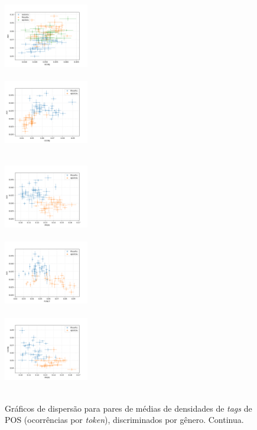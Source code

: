 \documentclass[10pt,a4paper,onecolumn]{article}
\theoremstyle{definition}
\theoremstyle{remark}
\begin{document}
\begin{figure}[htpb!]
\begin{multicols}{3}
		\includegraphics[width=0.33\textwidth]{graficos/ADV_x_SCONJ.png} \\  \\
		\includegraphics[width=0.33\textwidth]{graficos/AUX_x_CCONJ.png} \\  \\
	\end{multicols}\vspace{-0.8cm}
	\begin{multicols}{3}
		\includegraphics[width=0.33\textwidth]{graficos/AUX_x_PRON.png} \\  \\
		\includegraphics[width=0.33\textwidth]{graficos/AUX_x_PUNCT.png} \\  \\
		\includegraphics[width=0.33\textwidth]{graficos/CCONJ_x_PRON.png} \\  \\
	\end{multicols}\vspace{-0.5cm}
	\caption{Gráficos de dispersão para pares de médias de densidades de \emph{tags} de POS (ocorrências por \emph{token}), discriminados por gênero. Continua.}
	\label{fig:dispersoes1}
\end{figure}
\end{document}
